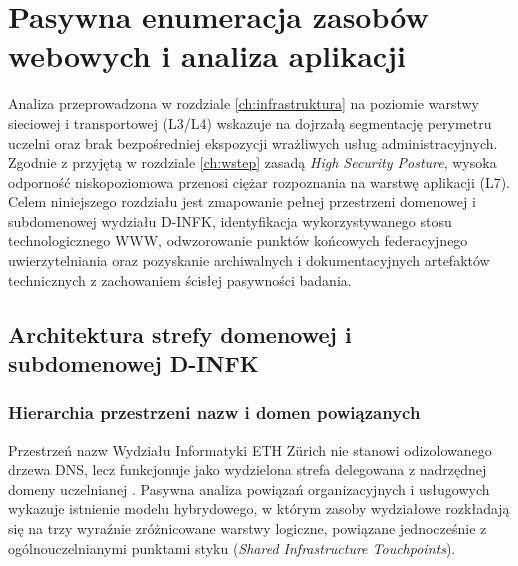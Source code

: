 \chapter{Pasywna enumeracja zasobów webowych i analiza aplikacji}\label{ch:domeny-web}

Analiza przeprowadzona w rozdziale \ref{ch:infrastruktura} na poziomie warstwy sieciowej i transportowej (L3/L4) wskazuje na dojrzałą segmentację perymetru uczelni oraz brak bezpośredniej ekspozycji wrażliwych usług administracyjnych. Zgodnie z przyjętą w rozdziale \ref{ch:wstep} zasadą \textit{High Security Posture}, wysoka odporność niskopoziomowa przenosi ciężar rozpoznania na warstwę aplikacji (L7). Celem niniejszego rozdziału jest zmapowanie pełnej przestrzeni domenowej i subdomenowej wydziału D-INFK, identyfikacja wykorzystywanego stosu technologicznego WWW, odwzorowanie punktów końcowych federacyjnego uwierzytelniania oraz pozyskanie archiwalnych i dokumentacyjnych artefaktów technicznych z zachowaniem ścisłej pasywności badania.

\section{Architektura strefy domenowej i subdomenowej D-INFK}\label{sec:struktura-domenowa}

\subsection{Hierarchia przestrzeni nazw i domen powiązanych}\label{subsec:hierarchia-domen}

Przestrzeń nazw Wydziału Informatyki ETH Zürich nie stanowi odizolowanego drzewa DNS, lecz funkcjonuje jako wydzielona strefa  delegowana z nadrzędnej domeny uczelnianej  \cite{eth_dinfk}. Pasywna analiza powiązań organizacyjnych i usługowych wykazuje istnienie modelu hybrydowego, w którym zasoby wydziałowe rozkładają się na trzy wyraźnie zróżnicowane warstwy logiczne, powiązane jednocześnie z ogólnouczelnianymi punktami styku (\textit{Shared Infrastructure Touchpoints}).

